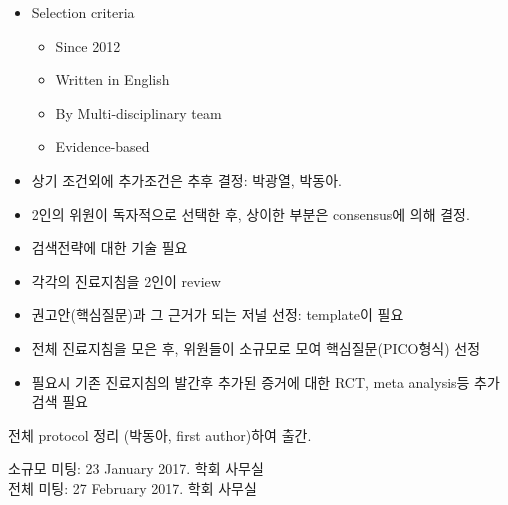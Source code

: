 \documentclass[idxtotoc,hyperref,openany, oneside]{labbook} %
\begin{document}
	\begin{itemize}
		\item Selection criteria
			\begin{itemize}
				\item Since 2012
				\item Written in English
				\item By Multi-disciplinary team
				\item Evidence-based
			\end{itemize}
		\item 상기 조건외에 추가조건은 추후 결정: 박광열, 박동아.
		\item 2인의 위원이 독자적으로 선택한 후, 상이한 부분은 consensus에 의해 결정.
		\item 검색전략에 대한 기술 필요
	\end{itemize}
	
	\begin{itemize}
		\item 각각의 진료지침을 2인이 review
		\item 권고안(핵심질문)과 그 근거가 되는 저널 선정: template이 필요
		\item 전체 진료지침을 모은 후, 위원들이 소규모로 모여 핵심질문(PICO형식) 선정
		\item 필요시 기존 진료지침의 발간후 추가된 증거에 대한 RCT, meta analysis등 추가 검색 필요
	\end{itemize}

전체 protocol 정리 (박동아, first author)하여 출간.

소규모 미팅: 23 January 2017. 학회 사무실\\
전체 미팅: 27 February 2017. 학회 사무실

\end{document}
